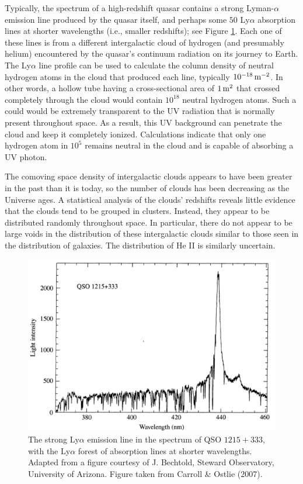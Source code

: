 \documentclass[a4paper,10pt]{article}
\begin{document}
{\noindent}Typically, the spectrum of a high-redshift quasar contains a strong Lyman-$\alpha$ emission line produced by the quasar itself, and perhaps some $50$ Ly$\alpha$ absorption lines at shorter wavelengths (i.e., smaller redshifts); see Figure \ref{fig:lymanalphaforest}. Each one of these lines is from a different intergalactic cloud of hydrogen (and presumably helium) encountered by the quasar's continuum radiation on its journey to Earth. The Ly$\alpha$ line profile can be used to calculate the column density of neutral hydrogen atoms in the cloud that produced each line, typically $10^{-18}\,{\rm m^{-2}}$. In other words, a hollow tube having a cross-sectional area of $1\,{\rm m^2}$ that crossed completely through the cloud would contain $10^{18}$ neutral hydrogen atoms. Such a could would be extremely transparent to the UV radiation that is normally present throughout space. As a result, this UV background can penetrate the cloud and keep it completely ionized. Calculations indicate that only one hydrogen atom in $10^5$ remains neutral in the cloud and is capable of absorbing a UV photon.

The comoving space density of intergalactic clouds appears to have been greater in the past than it is today, so the number of clouds has been decreasing as the Universe ages. A statistical analysis of the clouds' redshifts reveals little evidence that the clouds tend to be grouped in clusters. Instead, they appear to be distributed randomly throughout space. In particular, there do not appear to be large voids in the distribution of these intergalactic clouds similar to those seen in the distribution of galaxies. The distribution of He II is similarly uncertain.

\begin{figure}[t]
    \centering
    \includegraphics[width=14cm]{figures/LymanAlphaForest.png}
    \caption{\footnotesize{The strong Ly$\alpha$ emission line in the spectrum of QSO $1215+333$, with the Ly$\alpha$ forest of absorption lines at shorter wavelengths. Adapted from a figure courtesy of J. Bechtold, Steward Observatory, University of Arizona. Figure taken from Carroll \& Ostlie (2007).}}
    \label{fig:lymanalphaforest}
\end{figure}
\end{document}
